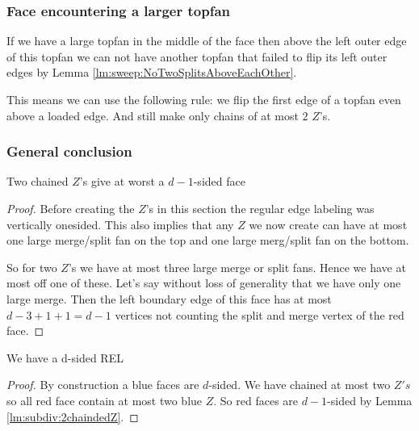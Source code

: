 \subsubsection{Face encountering a larger topfan}
If we have a large topfan in the middle of the face then above the left outer edge of this topfan we can not have another topfan that failed to flip its left outer edges by Lemma \ref{lm:sweep:NoTwoSplitsAboveEachOther}.

This means we can use the following rule: we flip the first edge of a topfan even above a loaded edge. And still make only chains of at most $2$ $Z$'s.


\subsubsection{General conclusion}
\begin{lemma}
  \label{lm:subdiv:2chaindedZ}
  Two chained $Z$'s give at worst a $d-1$-sided face
\end{lemma}
\begin{proof}
  Before creating the $Z$'s in this section the regular edge labeling was vertically onesided. This also implies that  any $Z$ we now create can have at most one large merge/split fan on the top and one large merg/split fan on the bottom.

  So for two $Z$'s we have at most three large merge or split fans. Hence we have at most off one of these. Let's say without loss of generality that we have only one large merge. Then the left boundary edge of this face has at most $d-3 + 1 +1 =d-1$ vertices not counting the split and merge vertex of the red face.
\end{proof}

\begin{thrm}
  \label{th:final}
  We have a d-sided REL
\end{thrm}

\begin{proof}
  By construction a blue faces are $d$-sided. We have chained at most two $Z's$ so all red face contain at most two blue $Z$. So red faces are $d-1$-sided by Lemma \ref{lm:subdiv:2chaindedZ}.
\end{proof}
